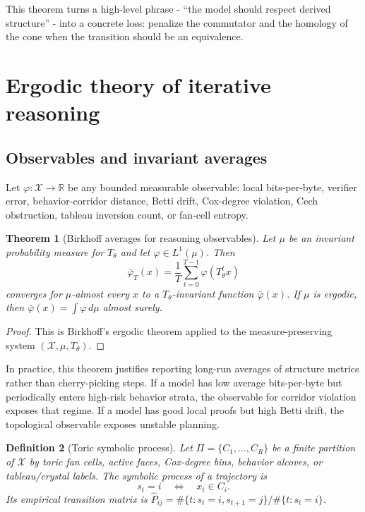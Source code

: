\documentclass[10pt]{article}
\newtheorem{theorem}{Theorem}[section]
\newtheorem{definition}[theorem]{Definition}
\newcommand{\RR}{\mathbb{R}}
\newcommand{\calX}{\mathcal{X}}
\numberwithin{equation}{section}
\begin{document}
This theorem turns a high-level phrase - ``the model should respect derived structure'' - into a concrete loss: penalize the commutator and the homology of the cone when the transition should be an equivalence.

\section{Ergodic theory of iterative reasoning}
\subsection{Observables and invariant averages}
Let $\varphi:\calX\to\RR$ be any bounded measurable observable: local bits-per-byte, verifier error, behavior-corridor distance, Betti drift, Cox-degree violation, Cech obstruction, tableau inversion count, or fan-cell entropy.

\begin{theorem}[Birkhoff averages for reasoning observables]
Let $\mu$ be an invariant probability measure for $T_\theta$ and let $\varphi\in L^1(\mu)$. Then
\begin{equation}
\bar\varphi_T(x)=\frac1T\sum_{t=0}^{T-1}\varphi(T_\theta^t x)
\end{equation}
converges for $\mu$-almost every $x$ to a $T_\theta$-invariant function $\bar\varphi(x)$. If $\mu$ is ergodic, then $\bar\varphi(x)=\int \varphi\,d\mu$ almost surely.
\end{theorem}
\begin{proof}
This is Birkhoff's ergodic theorem applied to the measure-preserving system $(\calX,\mu,T_\theta)$.
\end{proof}

In practice, this theorem justifies reporting long-run averages of structure metrics rather than cherry-picking steps. If a model has low average bits-per-byte but periodically enters high-risk behavior strata, the observable for corridor violation exposes that regime. If a model has good local proofs but high Betti drift, the topological observable exposes unstable planning.

\begin{definition}[Toric symbolic process]
Let $\Pi=\{C_1,\ldots,C_R\}$ be a finite partition of $\calX$ by toric fan cells, active faces, Cox-degree bins, behavior alcoves, or tableau/crystal labels. The symbolic process of a trajectory is
\begin{equation}
s_t=i\quad\Longleftrightarrow\quad x_t\in C_i.
\end{equation}
Its empirical transition matrix is $\widehat P_{ij}=\#\{t:s_t=i,s_{t+1}=j\}/\#\{t:s_t=i\}$.
\end{definition}
\end{document}
